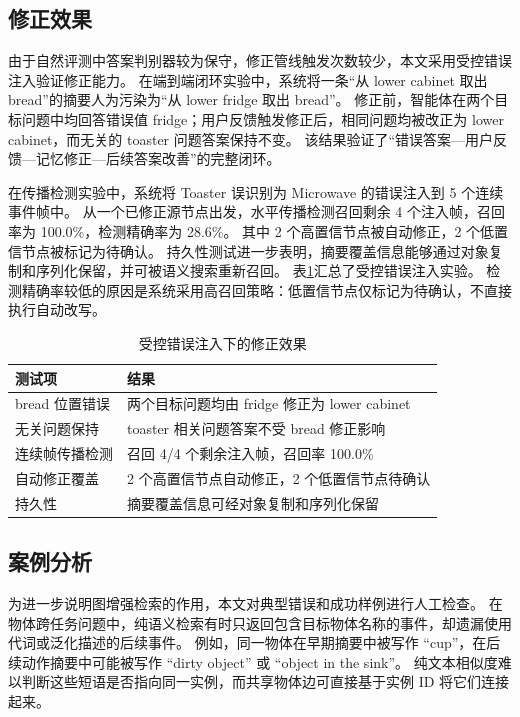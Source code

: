 \documentclass{cjc}
\begin{document}
\subsection{修正效果}

由于自然评测中答案判别器较为保守，修正管线触发次数较少，本文采用受控错误注入验证修正能力。
在端到端闭环实验中，系统将一条“从 lower cabinet 取出 bread”的摘要人为污染为“从 lower fridge 取出 bread”。
修正前，智能体在两个目标问题中均回答错误值 fridge；用户反馈触发修正后，相同问题均被改正为 lower cabinet，而无关的 toaster 问题答案保持不变。
该结果验证了“错误答案—用户反馈—记忆修正—后续答案改善”的完整闭环。

在传播检测实验中，系统将 Toaster 误识别为 Microwave 的错误注入到 5 个连续事件帧中。
从一个已修正源节点出发，水平传播检测召回剩余 4 个注入帧，召回率为 100.0\%，检测精确率为 28.6\%。
其中 2 个高置信节点被自动修正，2 个低置信节点被标记为待确认。
持久性测试进一步表明，摘要覆盖信息能够通过对象复制和序列化保留，并可被语义搜索重新召回。
表\ref{tab:correction}汇总了受控错误注入实验。
检测精确率较低的原因是系统采用高召回策略：低置信节点仅标记为待确认，不直接执行自动改写。

\begin{table}[t]
  \centering
  \caption{受控错误注入下的修正效果}
  \label{tab:correction}
  \small
  \begin{tabular}{p{3.2cm}p{11.2cm}}
    \toprule
    测试项 & 结果 \\
    \midrule
    bread 位置错误 & 两个目标问题均由 fridge 修正为 lower cabinet \\
    无关问题保持 & toaster 相关问题答案不受 bread 修正影响 \\
    连续帧传播检测 & 召回 4/4 个剩余注入帧，召回率 100.0\% \\
    自动修正覆盖 & 2 个高置信节点自动修正，2 个低置信节点待确认 \\
    持久性 & 摘要覆盖信息可经对象复制和序列化保留 \\
    \bottomrule
  \end{tabular}
\end{table}

\subsection{案例分析}

为进一步说明图增强检索的作用，本文对典型错误和成功样例进行人工检查。
在物体跨任务问题中，纯语义检索有时只返回包含目标物体名称的事件，却遗漏使用代词或泛化描述的后续事件。
例如，同一物体在早期摘要中被写作 “cup”，在后续动作摘要中可能被写作 “dirty object” 或 “object in the sink”。
纯文本相似度难以判断这些短语是否指向同一实例，而共享物体边可直接基于实例 ID 将它们连接起来。
\end{document}
